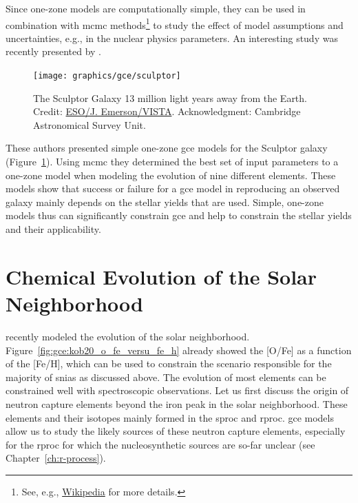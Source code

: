 Since one-zone models are computationally simple, they can be used in combination with \acf{mcmc} methods\footnote{See, e.g., \href{https://en.wikipedia.org/wiki/Markov_chain_Monte_Carlo}{Wikipedia} for more details.} to study the effect of model assumptions and uncertainties, e.g., in the nuclear physics parameters. An interesting study was recently presented by \citet{cote17}. 
\begin{figure}[tb]
    \centering
    \texttt{[image: graphics/gce/sculptor]}
    \caption{The Sculptor Galaxy 13 million light years away from the Earth. Credit: \href{https://www.eso.org/public/images/eso1025a/}{ESO/J. Emerson/VISTA}. Acknowledgment: Cambridge Astronomical Survey Unit.}
    \label{fig:gce:sculptor}
\end{figure}
These authors presented simple one-zone \ac{gce} models for the Sculptor galaxy (Figure~\ref{fig:gce:sculptor}). Using \ac{mcmc} they determined the best set of input parameters to a one-zone model when modeling the evolution of nine different elements. These models show that success or failure for a \ac{gce} model in reproducing an observed galaxy mainly depends on the stellar yields that are used. Simple, one-zone models thus can significantly constrain \ac{gce} and help to constrain the stellar yields and their applicability.




\section{Chemical Evolution of the Solar Neighborhood} \label{sec:gce:chemical_evolution_solar_neighborhood}

\citet{kobayashi20} recently modeled the evolution of the solar neighborhood. Figure~\ref{fig:gce:kob20_o_fe_versu_fe_h} already showed the [O/Fe] as a function of the [Fe/H], which can be used to constrain the scenario responsible for the majority of \acp{snia} as discussed above. The evolution of most elements can be constrained well with spectroscopic observations. Let us first discuss the origin of neutron capture elements beyond the iron peak in the solar neighborhood. These elements and their isotopes mainly formed in the \ac{sproc} and \ac{rproc}. \ac{gce} models allow us to study the likely sources of these neutron capture elements, especially for the \ac{rproc} for which the nucleosynthetic sources are so-far unclear (see Chapter~\ref{ch:r-process}).

